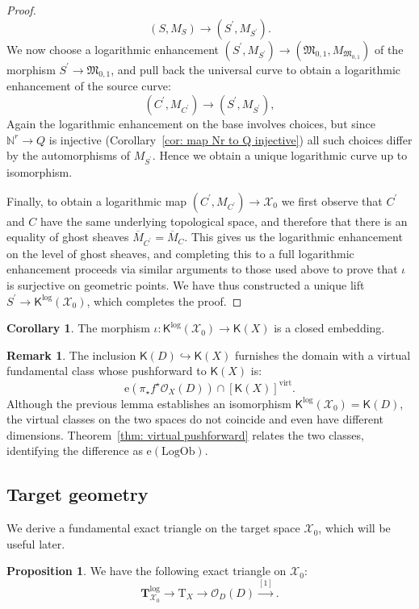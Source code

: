 \documentclass[11pt]{amsart}
\theoremstyle{definition}
\theoremstyle{definition}
\newtheorem{corollary}[theorem]{Corollary}
\newtheorem{proposition}[theorem]{Proposition}
\newtheorem{remark}[theorem]{Remark}
\newcommand{\op}[1]{\operatorname{#1}}
\newcommand{\ol}[1]{\overline{#1}}
\newcommand{\TTlog}{\mathbf{T}^{\op{log}}}
\newcommand{\e}{\mathrm{e}}
\newcommand{\T}{\mathrm{T}}
\newcommand{\OO}{\mathcal{O}}
\newcommand{\N}{\mathbb{N}}
\newcommand{\virt}{\op{virt}}
\newcommand{\LogOb}{\mathrm{LogOb}}
\newcommand{\Xcal}{\mathcal{X}}
\newcommand{\Mfrak}{\mathfrak{M}}
\newcommand{\Kup}{\mathsf{K}}
\begin{document}
\begin{proof}
\begin{equation*} (S,M_S) \to (S^\prime,M_{S^\prime}).\end{equation*}
We now choose a logarithmic enhancement $(S^\prime,M_{S^\prime}) \to (\Mfrak_{0,1},M_{\Mfrak_{0,1}})$ of the morphism $S^\prime \to \Mfrak_{0,1}$, and pull back the universal curve to obtain a logarithmic enhancement of the source curve:
\begin{equation*} (C^\prime,M_{C^\prime}) \to (S^\prime,M_{S^\prime}),\end{equation*}
Again the logarithmic enhancement on the base involves choices, but since $\N^r \to Q$ is injective (Corollary~\ref{cor: map Nr to Q injective}) all such choices differ by the automorphisms of $M_{S^\prime}$. Hence we obtain a unique logarithmic curve up to isomorphism.

Finally, to obtain a logarithmic map $(C^\prime,M_{C^\prime}) \to \Xcal_0$ we first observe that $C^\prime$ and $C$ have the same underlying topological space, and therefore that there is an equality of ghost sheaves $\ol{M}_{C^\prime} = \ol{M}_C$. This gives us the logarithmic enhancement on the level of ghost sheaves, and completing this to a full logarithmic enhancement proceeds via similar arguments to those used above to prove that $\iota$ is surjective on geometric points. We have thus constructed a unique lift $S^\prime \to \Kup^{\log}(\Xcal_0)$, which completes the proof.\end{proof}

\begin{corollary}\label{cor: iota closed embedding} The morphism $\iota \colon \Kup^{\log}(\Xcal_0) \to \Kup(X)$ is a closed embedding.\end{corollary}

\begin{remark} The inclusion $\Kup(D) \hookrightarrow \Kup(X)$ furnishes the domain with a virtual fundamental class whose pushforward to $\Kup(X)$ is:
\[ \e(\pi_\star f^\star \OO_X(D)) \cap [\Kup(X)]^{\virt}.\]
Although the previous lemma establishes an isomorphism $\Kup^{\log}(\Xcal_0)=\Kup(D)$, the virtual classes on the two spaces do not coincide and even have different dimensions. Theorem~\ref{thm: virtual pushforward} relates the two classes, identifying the difference as $\e(\LogOb)$. \end{remark}


\subsection{Target geometry} We derive a fundamental exact triangle on the target space $\Xcal_0$, which will be useful later.
\begin{proposition}\label{prop: exact triangle on X0} We have the following exact triangle on $\Xcal_0$:	
\begin{equation}\label{eqn: important triangle on X0} \TTlog_{\Xcal_0} \to \T_X \to  \OO_D(D) \xrightarrow{[1]}. \end{equation}
\end{proposition}
\end{document}
